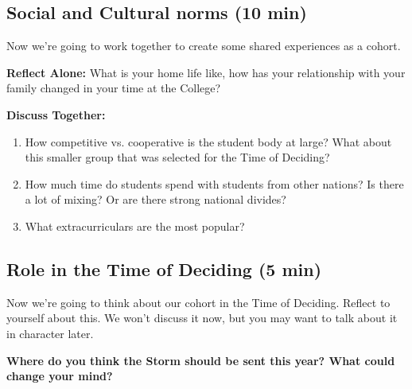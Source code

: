 \documentclass[green]{GL2020}
\begin{document}
\subsection*{Social and Cultural norms (10 min)}
Now we’re going to work together to create some shared experiences as a cohort.

\textbf{Reflect Alone:} What is your home life like, how has your relationship with your family changed in your time at the College?

\textbf{Discuss Together:}
\begin{enumerate}
	\item How competitive vs. cooperative is the student body at large? What about this smaller group that was selected for the Time of Deciding?
	\item How much time do students spend with students from other nations? Is there a lot of mixing? Or are there strong national divides?
	\item What extracurriculars are the most popular?
\end{enumerate}

\subsection*{Role in the Time of Deciding (5 min)}
Now we’re going to think about our cohort in the Time of Deciding. Reflect to yourself about this. We won't discuss it now, but you may want to talk about it in character later.

\textbf{Where do you think the Storm should be sent this year? What could change your mind?}
\end{document}
